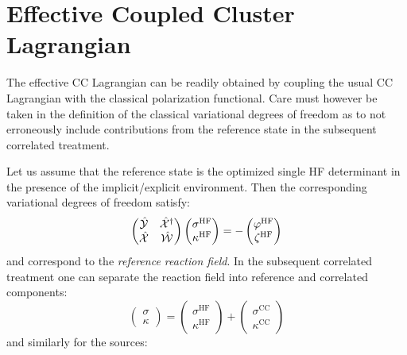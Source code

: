\section{Effective Coupled Cluster Lagrangian}

The effective CC Lagrangian can be readily obtained by coupling the
usual CC Lagrangian with the classical polarization functional.
Care must however be taken in the definition of the classical
variational degrees of freedom as to not erroneously include
contributions from the reference state in the subsequent correlated
treatment.

Let us assume that the reference state is the optimized single \acs{HF}
determinant in the presence of the implicit/explicit environment.
Then the corresponding variational degrees of freedom satisfy:
\begin{equation}
  \begin{pmatrix}
    \hat{\mathcal{Y}} & \hat{\mathcal{X}}^\dagger \\
    \hat{\mathcal{X}} & \hat{\mathcal{W}}
  \end{pmatrix}
  \begin{pmatrix}
   \sigma^\mathrm{HF} \\
   \kappa^\mathrm{HF}
  \end{pmatrix}
  =
  -
  \begin{pmatrix}
   \varphi^\mathrm{HF} \\
   \zeta^\mathrm{HF}
  \end{pmatrix}
\end{equation}
and correspond to the \emph{reference reaction field}.
In the subsequent correlated treatment one can separate the reaction
field into reference and correlated components:
\begin{equation}
  \begin{pmatrix}
   \sigma \\
   \kappa
  \end{pmatrix}
  =
  \begin{pmatrix}
   \sigma^\mathrm{HF} \\
   \kappa^\mathrm{HF}
  \end{pmatrix}
  +
  \begin{pmatrix}
   \sigma^\mathrm{CC} \\
   \kappa^\mathrm{CC}
  \end{pmatrix}
\end{equation}
and similarly for the sources:
